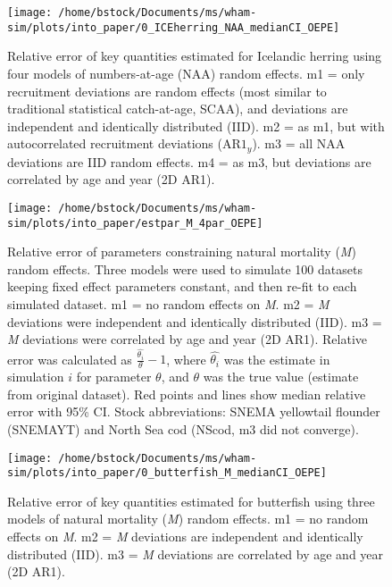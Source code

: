 \documentclass[]{article}
\begin{document}
\pagebreak

\begin{figure}

{\centering \texttt{[image: /home/bstock/Documents/ms/wham-sim/plots/into\_paper/0\_ICEherring\_NAA\_medianCI\_OEPE]} 

}

\caption{Relative error of key quantities estimated for Icelandic herring using four models of numbers-at-age (NAA) random effects. m1 = only recruitment deviations are random effects (most similar to traditional statistical catch-at-age, SCAA), and deviations are independent and identically distributed (IID). m2 = as m1, but with autocorrelated recruitment deviations ($\text{AR1}_y$). m3 = all NAA deviations are IID random effects. m4 = as m3, but deviations are correlated by age and year (2D AR1).}\label{fig:rel-error-ICEherring-naa}
\end{figure}

\pagebreak

\begin{figure}

{\centering \texttt{[image: /home/bstock/Documents/ms/wham-sim/plots/into\_paper/estpar\_M\_4par\_OEPE]} 

}

\caption{Relative error of parameters constraining natural mortality (\textit{M}) random effects. Three models were used to simulate 100 datasets keeping fixed effect parameters constant, and then re-fit to each simulated dataset. m1 = no random effects on \textit{M}. m2 = \textit{M} deviations were independent and identically distributed (IID). m3 = \textit{M} deviations were correlated by age and year (2D AR1). Relative error was calculated as $\frac{\hat{\theta_i}}{\theta} - 1$, where $\hat{\theta_i}$ was the estimate in simulation $i$ for parameter $\theta$, and $\theta$ was the true value (estimate from original dataset). Red points and lines show median relative error with 95\% CI. Stock abbreviations: SNEMA yellowtail flounder (SNEMAYT) and North Sea cod (NScod, m3 did not converge).}\label{fig:estpar-m}
\end{figure}

\pagebreak

\begin{figure}

{\centering \texttt{[image: /home/bstock/Documents/ms/wham-sim/plots/into\_paper/0\_butterfish\_M\_medianCI\_OEPE]} 

}

\caption{Relative error of key quantities estimated for butterfish using three models of natural mortality (\textit{M}) random effects. m1 = no random effects on \textit{M}. m2 = \textit{M} deviations are independent and identically distributed (IID). m3 = \textit{M} deviations are correlated by age and year (2D AR1).}\label{fig:rel-error-butterfish-m}
\end{figure}
\end{document}
